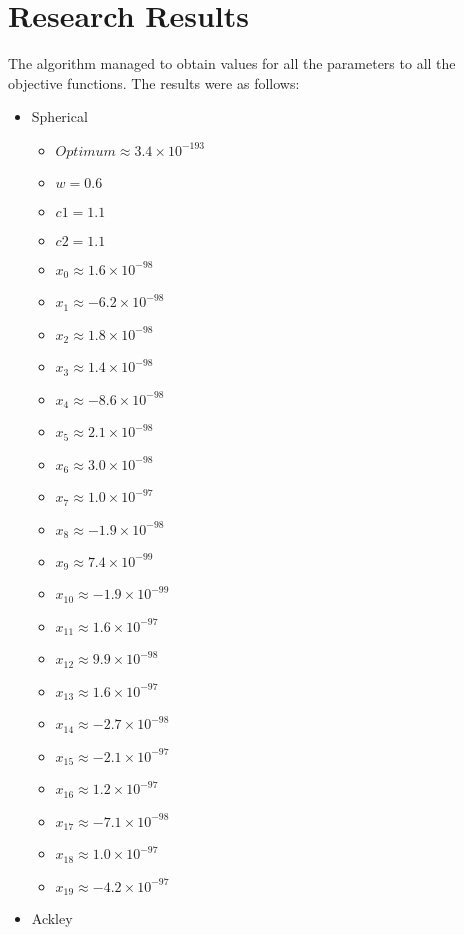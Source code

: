 \documentclass[hidelinks,english,conference]{IEEEtran}
\begin{document}
\section{Research Results}\label{researchResultsSection}
The algorithm managed to obtain values for all the parameters to all the objective functions. The results were as follows:
\begin{itemize}
	\item Spherical\\
		\begin{itemize}
			\item $Optimum \approx 3.4 \times 10^{-193}$
			\item $w = 0.6$
			\item $c1 = 1.1$
			\item $c2 = 1.1$
			\item $x_{0} \approx 1.6 \times 10^{-98}$
			\item $x_{1} \approx -6.2 \times 10^{-98}$
			\item $x_{2} \approx 1.8 \times 10^{-98}$
			\item $x_{3} \approx 1.4 \times 10^{-98}$
			\item $x_{4} \approx -8.6 \times 10^{-98}$
			\item $x_{5} \approx 2.1 \times 10^{-98}$
			\item $x_{6} \approx 3.0 \times 10^{-98}$
			\item $x_{7} \approx 1.0 \times 10^{-97}$
			\item $x_{8} \approx -1.9 \times 10^{-98}$
			\item $x_{9} \approx 7.4 \times 10^{-99}$
			\item $x_{10} \approx -1.9 \times 10^{-99}$
			\item $x_{11} \approx 1.6 \times 10^{-97}$
			\item $x_{12} \approx 9.9 \times 10^{-98}$
			\item $x_{13} \approx 1.6 \times 10^{-97}$
			\item $x_{14} \approx -2.7 \times 10^{-98}$
			\item $x_{15} \approx -2.1 \times 10^{-97}$
			\item $x_{16} \approx 1.2 \times 10^{-97}$
			\item $x_{17} \approx -7.1 \times 10^{-98}$
			\item $x_{18} \approx 1.0 \times 10^{-97}$
			\item $x_{19} \approx -4.2 \times 10^{-97}$
		\end{itemize}
	\item Ackley\\

\end{itemize}
\end{document}
